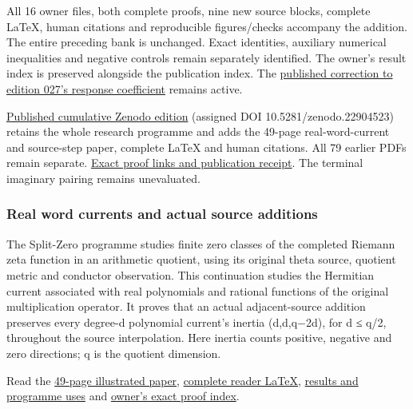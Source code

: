 \documentclass[
]{article}
\begin{document}
All 16 owner files, both complete proofs, nine new source blocks,
complete LaTeX, human citations and reproducible figures/checks
accompany the addition. The entire preceding bank is unchanged. Exact
identities, auxiliary numerical inequalities and negative controls
remain separately identified. The owner's result index is preserved
alongside the publication index. The
\href{https://github.com/KokunoYumeto/zeta-function-research-reader/blob/4ba9285b66af58a6d58fc502a494c1fb45ca5b79/workbenches/splitzero-tandem/continuations/20260922-support-transport/CORRECTION_027_RD15.md}{published
correction to edition 027's response coefficient} remains active.

\href{https://zenodo.org/records/22904523}{Published cumulative Zenodo
edition} (assigned DOI 10.5281/zenodo.22904523) retains the whole
research programme and adds the 49-page real-word-current and
source-step paper, complete LaTeX and human citations. All 79 earlier
PDFs remain separate.
\href{https://github.com/KokunoYumeto/zeta-function-research-reader/blob/main/workbenches/splitzero-tandem/continuations/20260922-real-words-source-steps-publication/README.md}{Exact
proof links and publication receipt}. The terminal imaginary pairing
remains unevaluated.

\subsubsection{Real word currents and actual source
additions}\label{real-word-currents-and-actual-source-additions}

The Split-Zero programme studies finite zero classes of the completed
Riemann zeta function in an arithmetic quotient, using its original
theta source, quotient metric and conductor observation. This
continuation studies the Hermitian current associated with real
polynomials and rational functions of the original multiplication
operator. It proves that an actual adjacent-source addition preserves
every degree-d polynomial current's inertia (d,d,q−2d), for d ≤ q/2,
throughout the source interpolation. Here inertia counts positive,
negative and zero directions; q is the quotient dimension.

Read the
\href{https://github.com/KokunoYumeto/zeta-function-research-reader/blob/main/workbenches/splitzero-tandem/continuations/20260922-real-words-source-steps/REAL_WORDS_AND_SOURCE_STEPS.pdf}{49-page
illustrated paper},
\href{https://github.com/KokunoYumeto/zeta-function-research-reader/blob/main/workbenches/splitzero-tandem/continuations/20260922-real-words-source-steps/REAL_WORDS_AND_SOURCE_STEPS.tex}{complete
reader LaTeX},
\href{https://github.com/KokunoYumeto/zeta-function-research-reader/blob/main/workbenches/splitzero-tandem/continuations/20260922-real-words-source-steps/RESULTS_20260922_029.md}{results
and programme uses} and
\href{https://github.com/KokunoYumeto/zeta-function-research-reader/blob/main/workbenches/splitzero-tandem/continuations/20260922-real-words-source-steps/RESULT_INDEX.json}{owner's
exact proof index}.
\end{document}
